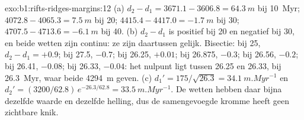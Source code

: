 \begin{solution}{exo:b1:rifts-ridges-margins:12}
(a) $d_2 - d_1 = 3671.1 - 3606.8 = \qty{64.3}{m}$ bij \qty{10}{Myr};
$4072.8 - 4065.3 = \qty{7.5}{m}$ bij 20; $4415.4 - 4417.0 = \qty{-1.7}{m}$ bij
30; $4707.5 - 4713.6 = \qty{-6.1}{m}$ bij 40. (b) $d_2 - d_1$ is positief bij 20
en negatief bij 30, en beide wetten zijn continu: ze zijn daartussen gelijk.
Bisectie: bij 25, $d_2 - d_1 = +0.9$; bij 27.5, $-0.7$; bij 26.25, $+0.01$; bij
26.875, $-0.3$; bij 26.56, $-0.2$; bij 26.41, $-0.08$; bij 26.33, $-0.04$: het
nulpunt ligt tussen 26.25 en 26.33, bij \qty{26.3}{Myr}, waar beide
\qty{4294}{m} geven. (c) $d_1' = 175/\sqrt{26.3} = \qty{34.1}{m.Myr^{-1}}$ en
$d_2' = (3200/62.8)\,e^{-26.3/62.8} = \qty{33.5}{m.Myr^{-1}}$. De wetten hebben
daar bijna dezelfde waarde en dezelfde helling, dus de samengevoegde kromme
heeft geen zichtbare knik.
\end{solution}

